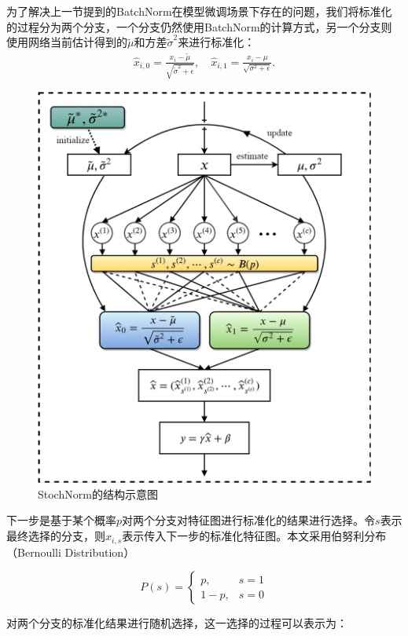 为了解决上一节提到的BatchNorm在模型微调场景下存在的问题，我们将标准化的过程分为两个分支，一个分支仍然使用BatchNorm的计算方式，另一个分支则使用网络当前估计得到的$\tilde{\mu}$和方差$\tilde{\sigma}^2$来进行标准化：
\begin{equation}
  \label{equal-sn_mean&var}
  \begin{aligned}
    \widehat{x}_{i,0}=\frac{x_{i}-\tilde{\mu}}{\sqrt{\tilde{\sigma}^{2}+\epsilon}},\quad
    \widehat{x}_{i,1}=\frac{x_{i}-\mu}{\sqrt{\sigma^{2}+\epsilon}}.
  \end{aligned}
\end{equation}

\begin{figure}
  \centering
  \includegraphics[width=0.7\linewidth]{figures/arch2.png}
  \caption{StochNorm的结构示意图}
  \label{fig:arch}
\end{figure}

下一步是基于某个概率$p$对两个分支对特征图进行标准化的结果进行选择。令$s$表示最终选择的分支，则$x_{i,s}$表示传入下一步的标准化特征图。本文采用伯努利分布（Bernoulli Distribution）

\begin{equation}
  P(s)=\left\{
  \begin{matrix}
    p, & s=1\\ 
    1-p,  & s=0
  \end{matrix}
  \right.
\end{equation}

对两个分支的标准化结果进行随机选择，这一选择的过程可以表示为：


